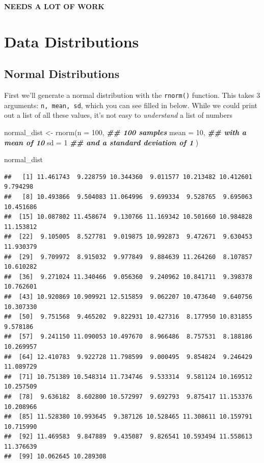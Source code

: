 \documentclass[
]{book}
\newenvironment{Shaded}{\begin{snugshade}}{\end{snugshade}}
\newcommand{\AttributeTok}[1]{\textcolor[rgb]{0.77,0.63,0.00}{#1}}
\newcommand{\DecValTok}[1]{\textcolor[rgb]{0.00,0.00,0.81}{#1}}
\newcommand{\DocumentationTok}[1]{\textcolor[rgb]{0.56,0.35,0.01}{\textbf{\textit{#1}}}}
\newcommand{\FunctionTok}[1]{\textcolor[rgb]{0.00,0.00,0.00}{#1}}
\newcommand{\NormalTok}[1]{#1}
\newcommand{\OtherTok}[1]{\textcolor[rgb]{0.56,0.35,0.01}{#1}}
\begin{document}
\textbf{NEEDS A LOT OF WORK}

\hypertarget{data-distributions}{%
\section{Data Distributions}\label{data-distributions}}

\hypertarget{normal-distributions}{%
\subsection{Normal Distributions}\label{normal-distributions}}

First we'll generate a normal distribution with the \texttt{rnorm()} function. This takes 3 arguments: \texttt{n,\ mean,\ sd}, which you can see filled in below. While we could print out a list of all these values, it's not easy to \emph{understand} a list of numbers

\begin{Shaded}
\begin{Highlighting}[]
\NormalTok{normal\_dist }\OtherTok{\textless{}{-}} \FunctionTok{rnorm}\NormalTok{(}\AttributeTok{n =} \DecValTok{100}\NormalTok{, }\DocumentationTok{\#\# 100 samples}
                     \AttributeTok{mean =} \DecValTok{10}\NormalTok{, }\DocumentationTok{\#\# with a mean of 10}
                     \AttributeTok{sd =} \DecValTok{1} \DocumentationTok{\#\# and a standard deviation of 1}
\NormalTok{                     )}


\NormalTok{normal\_dist}
\end{Highlighting}
\end{Shaded}

\begin{verbatim}
##   [1] 11.461743  9.228759 10.344360  9.011577 10.213482 10.412601  9.794298
##   [8] 10.493866  9.504083 11.064996  9.699334  9.528765  9.695063 10.451686
##  [15] 10.087802 11.458674  9.130766 11.169342 10.501660 10.984828 11.153812
##  [22]  9.105005  8.527781  9.019875 10.992873  9.472671  9.630453 11.930379
##  [29]  9.709972  8.915032  9.977849  9.884639 11.264260  8.107857 10.610282
##  [36]  9.271024 11.340466  9.056360  9.240962 10.841711  9.398378 10.762601
##  [43] 10.920869 10.909921 12.515859  9.062207 10.473640  9.640756 10.307330
##  [50]  9.751568  9.465202  9.822931 10.427316  8.177950 10.831855  9.578186
##  [57]  9.241150 11.090053 10.497670  8.966486  8.757531  8.188186 10.269957
##  [64] 12.410783  9.922728 11.798599  9.000495  9.854824  9.246429 11.089729
##  [71] 10.751389 10.548314 11.734746  9.533314  9.581124 10.169512 10.257509
##  [78]  9.636182  8.602800 10.572997  9.692793  9.875417 11.153376 10.208966
##  [85] 11.528380 10.993645  9.387126 10.528465 11.308611 10.159791 10.715990
##  [92] 11.469583  9.847889  9.435087  9.826541 10.593494 11.558613 11.376639
##  [99] 10.062645 10.289308
\end{verbatim}
\end{document}
